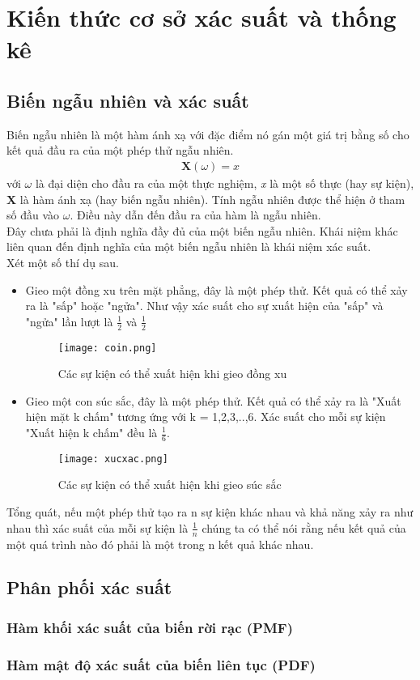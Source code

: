\chapter{Kiến thức cơ sở xác suất và thống kê}\label{ch:1}
\section{Biến ngẫu nhiên và xác suất}\label{sec:1.1}
Biến ngẫu nhiên là một hàm ánh xạ với đặc điểm nó gán một giá trị bằng số cho kết quả đầu ra của một phép thử ngẫu nhiên.
\begin{align}
    \textbf{X}(\omega)=\textit{x}
\end{align}
với $\omega$ là đại diện cho đầu ra của một thực nghiệm, \textit{x} là một số thực (hay sự kiện), \textbf{X} là hàm ánh xạ (hay biến ngẫu nhiên).  
Tính ngẫu nhiên được thể hiện ở tham số đầu vào $\omega$. Điều này dẫn đến đầu ra của hàm là ngẫu nhiên.\\
Đây chưa phải là định nghĩa đầy đủ của một biến ngẫu nhiên. Khái niệm khác liên quan đến định nghĩa của một biến ngẫu nhiên là khái niệm xác suất. \\
Xét một số thí dụ sau.
\begin{itemize}
    \item Gieo một đồng xu trên mặt phẳng, đây là một phép thử. Kết quả có thể xảy ra là "sấp" hoặc "ngửa". Như vậy xác suất cho sự xuất hiện của "sấp" và "ngửa" lần lượt là 
	$ \frac{1}{2} $ và $ \frac{1}{2} $
	\begin{figure}[H]
		\centering
		\texttt{[image: coin.png]}
		\caption{Các sự kiện có thể xuất hiện khi gieo đồng xu}
		\label{fig:web}
	   \end{figure}
    \item Gieo một con súc sắc, đây là một phép thử. Kết quả có thể xảy ra là "Xuất hiện mặt k chấm" tương ứng với k = 1,2,3,..,6. Xác suất cho mỗi sự kiện "Xuất hiện k chấm" đều là $ \frac{1}{6} $.
    \begin{figure}[H]
		\centering
		\texttt{[image: xucxac.png]}
		\caption{Các sự kiện có thể xuất hiện khi gieo súc sắc}
		\label{fig:web}
	   \end{figure}
\end{itemize}
Tổng quát, nếu một phép thử tạo ra n sự kiện khác nhau và khả năng xảy ra như nhau thì xác suất của mỗi sự kiện là $ \frac{1}{n} $
chúng ta có thể nói rằng nếu kết quả của một quá trình nào đó phải là một trong n kết quả khác nhau. 
\par
\section{Phân phối xác suất}\label{sec:1.2}
\par
\subsection{Hàm khối xác suất của biến rời rạc (PMF)}\label{subsec:1.2.1}
\par
\subsection{Hàm mật độ xác suất của biến liên tục (PDF)}\label{subsec:1.2.2}


